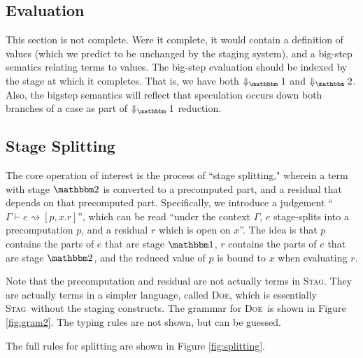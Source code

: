 \documentclass[11pt]{article}
\newcommand {\bbone} {\mathbbm 1}
\newcommand {\bbtwo} {\mathbbm 2}
\newcommand {\splits} {\rightsquigarrow}
\newcommand {\wstage} {\textsc{Stag}}
\newcommand {\wostage} {\textsc{Doe}}
\begin{document}
\subsection{Evaluation}
This section is not complete.  Were it complete, it would contain a definition of values (which we predict to be unchanged by the staging system), and a big-step sematics relating terms to values.  The big-step evaluation should be indexed by the stage at which it completes.  That is, we have both $\Downarrow_\bbone$ and $\Downarrow_\bbtwo$.  Also, the bigstep semantics will reflect that speculation occurs down both branches of a case as part of  $\Downarrow_\bbone$ reduction.

\subsection{Stage Splitting}

The core operation of interest is the process of ``stage splitting," wherein a term with stage $\bbtwo$ is converted to a precomputed part, and a residual that depends on that precomputed part.  Specifically, we introduce a judgement ``$\Gamma \vdash e \splits [p,x.r]$'', which can be read ``under the context $\Gamma$, $e$ stage-splits into a precomputation $p$, and a residual $r$ which is open on $x$''.  The idea is that $p$ contains the parts of $e$ that are stage $\bbone$, $r$ contains the parts of $e$ that are stage $\bbtwo$, and the reduced value of $p$ is bound to $x$ when evaluating $r$. 

Note that the precomputation and residual are not actually terms in \wstage.  They are actually terms in a simpler language, called \wostage, which is essentially \wstage~without the staging constructs.  The grammar for \wostage~is shown in Figure \ref{fig:gram2}.  The typing rules are not shown, but can be guessed.

The full rules for splitting are shown in Figure \ref{fig:splitting}.
\end{document}
